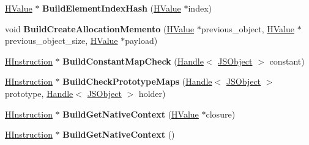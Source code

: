 \begin{DoxyCompactItemize}
\item 
\hyperlink{classv8_1_1internal_1_1_h_value}{H\+Value} $\ast$ {\bfseries Build\+Element\+Index\+Hash} (\hyperlink{classv8_1_1internal_1_1_h_value}{H\+Value} $\ast$index)\hypertarget{classv8_1_1internal_1_1_h_graph_builder_a2aef5fb1df007ee7a930ca88ea9ebfd3}{}\label{classv8_1_1internal_1_1_h_graph_builder_a2aef5fb1df007ee7a930ca88ea9ebfd3}

\item 
void {\bfseries Build\+Create\+Allocation\+Memento} (\hyperlink{classv8_1_1internal_1_1_h_value}{H\+Value} $\ast$previous\+\_\+object, \hyperlink{classv8_1_1internal_1_1_h_value}{H\+Value} $\ast$previous\+\_\+object\+\_\+size, \hyperlink{classv8_1_1internal_1_1_h_value}{H\+Value} $\ast$payload)\hypertarget{classv8_1_1internal_1_1_h_graph_builder_a581229d30d640590339529d79a90dc47}{}\label{classv8_1_1internal_1_1_h_graph_builder_a581229d30d640590339529d79a90dc47}

\item 
\hyperlink{classv8_1_1internal_1_1_h_instruction}{H\+Instruction} $\ast$ {\bfseries Build\+Constant\+Map\+Check} (\hyperlink{classv8_1_1internal_1_1_handle}{Handle}$<$ \hyperlink{classv8_1_1internal_1_1_j_s_object}{J\+S\+Object} $>$ constant)\hypertarget{classv8_1_1internal_1_1_h_graph_builder_ab081bd0afb68c40db6b629b24e6988e0}{}\label{classv8_1_1internal_1_1_h_graph_builder_ab081bd0afb68c40db6b629b24e6988e0}

\item 
\hyperlink{classv8_1_1internal_1_1_h_instruction}{H\+Instruction} $\ast$ {\bfseries Build\+Check\+Prototype\+Maps} (\hyperlink{classv8_1_1internal_1_1_handle}{Handle}$<$ \hyperlink{classv8_1_1internal_1_1_j_s_object}{J\+S\+Object} $>$ prototype, \hyperlink{classv8_1_1internal_1_1_handle}{Handle}$<$ \hyperlink{classv8_1_1internal_1_1_j_s_object}{J\+S\+Object} $>$ holder)\hypertarget{classv8_1_1internal_1_1_h_graph_builder_a6f475f92c21330451d9cdc37b4e3952a}{}\label{classv8_1_1internal_1_1_h_graph_builder_a6f475f92c21330451d9cdc37b4e3952a}

\item 
\hyperlink{classv8_1_1internal_1_1_h_instruction}{H\+Instruction} $\ast$ {\bfseries Build\+Get\+Native\+Context} (\hyperlink{classv8_1_1internal_1_1_h_value}{H\+Value} $\ast$closure)\hypertarget{classv8_1_1internal_1_1_h_graph_builder_a6e875339aaaa41090cddbf127dc14a4d}{}\label{classv8_1_1internal_1_1_h_graph_builder_a6e875339aaaa41090cddbf127dc14a4d}

\item 
\hyperlink{classv8_1_1internal_1_1_h_instruction}{H\+Instruction} $\ast$ {\bfseries Build\+Get\+Native\+Context} ()\hypertarget{classv8_1_1internal_1_1_h_graph_builder_ae8fa222e5b82e7871d33e6b7480a273b}{}\label{classv8_1_1internal_1_1_h_graph_builder_ae8fa222e5b82e7871d33e6b7480a273b}


\end{DoxyCompactItemize}
